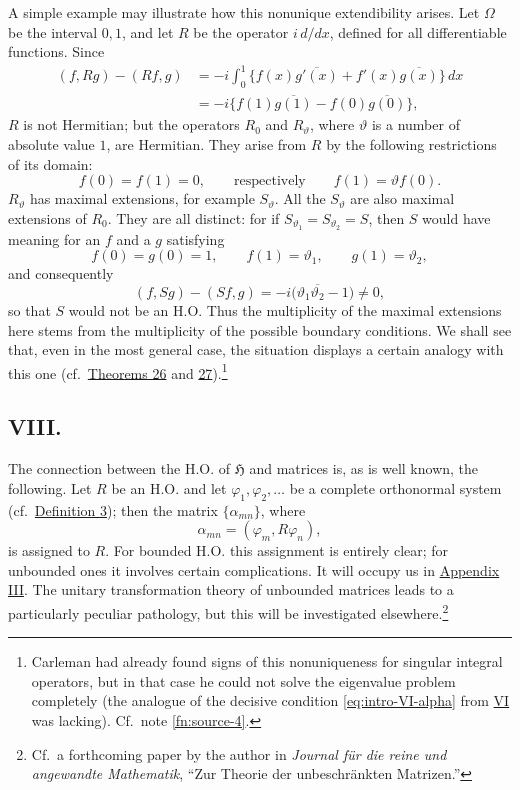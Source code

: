 ﻿\documentclass[paper=b5,fontsize=13pt,bookmarkpackage=false,twoside]{scrartcl}
\newcounter{translatornote}
\begin{document}
A simple example may illustrate how this nonunique extendibility arises. Let $\Omega$ be the interval $0,1$, and let $R$ be the operator $i\,d/dx$, defined for all differentiable functions. Since
\begin{align*}
 (f,Rg)-(Rf,g)
 &=-i\int_0^1\bigl\{f(x)\overline{g'(x)}+f'(x)\overline{g(x)}\bigr\}\,dx\\
 &=-i\bigl\{f(1)\overline{g(1)}-f(0)\overline{g(0)}\bigr\},
\end{align*}
$R$ is not Hermitian; but the operators $R_0$ and $R_\vartheta$, where $\vartheta$ is a number of absolute value $1$, are Hermitian. They arise from $R$ by the following restrictions of its domain:
\[
 f(0)=f(1)=0,
 \qquad\text{respectively}\qquad
 f(1)=\vartheta f(0).
\]
$R_\vartheta$ has maximal extensions, for example $S_\vartheta$. All the $S_\vartheta$ are also maximal extensions of $R_0$. They are all distinct: for if $S_{\vartheta_1}=S_{\vartheta_2}=S$, then $S$ would have meaning for an $f$ and a $g$ satisfying
\[
 f(0)=g(0)=1,\qquad f(1)=\vartheta_1,\qquad g(1)=\vartheta_2,
\]
and consequently
\[
 (f,Sg)-(Sf,g)
 =-i\bigl(\vartheta_1\overline{\vartheta_2}-1\bigr)\ne0,
\]
so that $S$ would not be an H.O. Thus the multiplicity of the maximal extensions here stems from the multiplicity of the possible boundary conditions. We shall see that, even in the most general case, the situation displays a certain analogy with this one (cf.\ \hyperref[thm:26]{Theorems 26} and \hyperref[thm:27]{27}).\footnote{\label{fn:source-21}Carleman had already found signs of this nonuniqueness for singular integral operators, but in that case he could not solve the eigenvalue problem completely (the analogue of the decisive condition \eqref{eq:intro-VI-alpha} from \hyperref[intro:VI]{VI} was lacking). Cf.\ note \ref{fn:source-4}.}

\subsection*{VIII.}\label{intro:VIII}

The connection between the H.O. of $\mathfrak H$ and matrices is, as is well known, the following. Let $R$ be an H.O. and let $\varphi_1,\varphi_2,\ldots$ be a complete orthonormal system (cf.\ \hyperref[def:3]{Definition 3}); then the matrix $\{\alpha_{mn}\}$, where
\[
 \alpha_{mn}=(\varphi_m,R\varphi_n),
\]
is assigned to $R$. For bounded H.O. this assignment is entirely clear; for unbounded ones it involves certain complications. It will occupy us in \hyperref[app:III]{Appendix III}. The unitary transformation theory of unbounded matrices leads to a particularly peculiar pathology, but this will be investigated elsewhere.\footnote{\label{fn:source-22}Cf.\ a forthcoming paper by the author in \emph{Journal für die reine und angewandte Mathematik}, ``Zur Theorie der unbeschränkten Matrizen.''}
\end{document}

